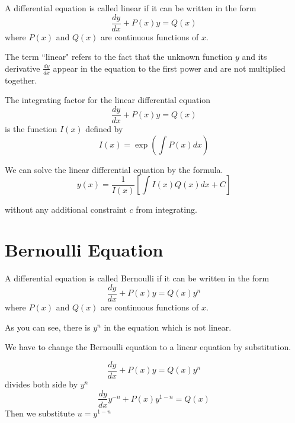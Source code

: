 \begin{definition}
  A differential equation is called linear if it can be written in the form
  \[
    \frac{dy}{dx} + P(x)y = Q(x)
  \]
  where \(P(x)\) and \(Q(x)\) are continuous functions of \(x\).

\end{definition}

The term ``linear" refers to the fact that the unknown function \(y\) and its derivative \(\frac{dy}{dx}\) appear in the equation to the first power and are not multiplied together.

\begin{definition}
  The integrating factor for the linear differential equation
  \[
    \frac{dy}{dx} + P(x)y = Q(x)
  \]
  is the function \(I(x)\) defined by
  \[
    I(x) = \exp(\int P(x)dx)
  \]
\end{definition}

We can solve the linear differential equation by the formula.
\[
  y(x) = \frac{1}{I(x)}[\int I(x)Q(x)dx + C]
\]

without any additional constraint \(c\) from integrating.

\section{Bernoulli Equation}

\begin{definition}
  A differential equation is called Bernoulli if it can be written in the form
  \[
    \frac{dy}{dx} + P(x)y = Q(x)y^n
  \]
  where \(P(x)\) and \(Q(x)\) are continuous functions of \(x\).
\end{definition}

As you can see, there is $y^n$ in the equation which is not linear.

We have to change the Bernoulli equation to a linear equation by substitution.

\[
  \frac{dy}{dx} + P(x)y = Q(x)y^n
\]
divides both side by $y^n$
\[
  \frac{dy}{dx}y^{-n} + P(x)y^{1-n} = Q(x)
\]
Then we substitute $u = y^{1-n}$

